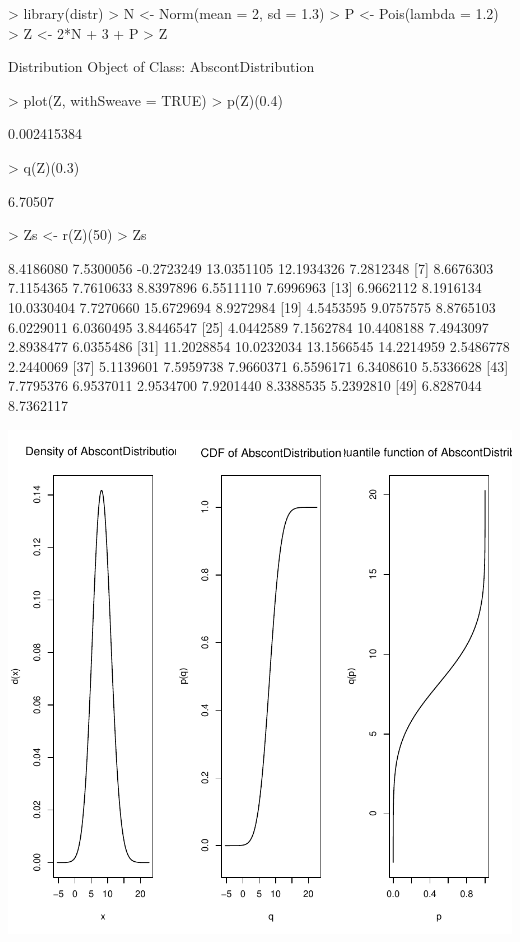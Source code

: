 \documentclass[11pt]{article}
\begin{document}
\begin{Schunk}
\begin{Sinput}
> library(distr)
> N <- Norm(mean = 2, sd = 1.3)
> P <- Pois(lambda = 1.2)
> Z <- 2*N + 3 + P
> Z
\end{Sinput}
\begin{Soutput}
Distribution Object of Class: AbscontDistribution
\end{Soutput}
\begin{Sinput}
> plot(Z, withSweave = TRUE)
> p(Z)(0.4)
\end{Sinput}
\begin{Soutput}
[1] 0.002415384
\end{Soutput}
\begin{Sinput}
> q(Z)(0.3)
\end{Sinput}
\begin{Soutput}
[1] 6.70507
\end{Soutput}
\begin{Sinput}
> Zs <- r(Z)(50)
> Zs
\end{Sinput}
\begin{Soutput}
 [1]  8.4186080  7.5300056 -0.2723249 13.0351105 12.1934326  7.2812348
 [7]  8.6676303  7.1154365  7.7610633  8.8397896  6.5511110  7.6996963
[13]  6.9662112  8.1916134 10.0330404  7.7270660 15.6729694  8.9272984
[19]  4.5453595  9.0757575  8.8765103  6.0229011  6.0360495  3.8446547
[25]  4.0442589  7.1562784 10.4408188  7.4943097  2.8938477  6.0355486
[31] 11.2028854 10.0232034 13.1566545 14.2214959  2.5486778  2.2440069
[37]  5.1139601  7.5959738  7.9660371  6.5596171  6.3408610  5.5336628
[43]  7.7795376  6.9537011  2.9534700  7.9201440  8.3388535  5.2392810
[49]  6.8287044  8.7362117
\end{Soutput}
\end{Schunk}
\includegraphics{distr-exam1}
\end{document}

